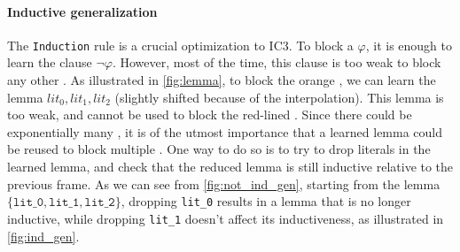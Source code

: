 \paragraph{Inductive generalization}
The \texttt{Induction} rule is a crucial optimization to IC3. To block a \pob
$\varphi$, it is enough to learn the clause $\lnot \varphi$. However, most of the
time, this clause is too weak to block any other \pob. As illustrated in
\cref{fig:lemma}, to block the orange \pob, we can learn the lemma
${lit_0, lit_1, lit_2}$ (slightly shifted because of the interpolation). This
lemma is too weak, and cannot be used to block the red-lined \pob. Since there
could be exponentially many \pobs, it is of the utmost importance that a learned
lemma could be reused to block multiple \pobs. One way to do so is to try to
drop literals in the learned lemma, and check that the reduced lemma is still
inductive relative to the previous frame.
As we can see from \cref{fig:not_ind_gen}, starting from the lemma $\{\texttt{lit\_0}, \texttt{lit\_1}, \texttt{lit\_2}\}$, dropping \texttt{lit\_0} results in a lemma that is no longer inductive, while dropping \texttt{lit\_1} doesn't affect its inductiveness, as illustrated in \cref{fig:ind_gen}.

